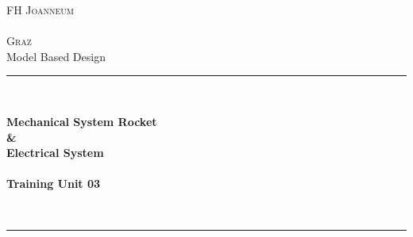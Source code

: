 \thispagestyle{empty}


\begin{titlepage}

	\begin{center}
	
	\textsc{
		\LARGE FH Joanneum\\~\\Graz}\\[1.5cm]
	\vfill{}
	\large Model Based Design
	\\[0.5cm]
	\newcommand{\HRule}{\rule{\linewidth}{0.5mm}}
	\HRule
	\\[0.4cm]
	{
	
		\Huge \bfseries Mechanical System Rocket\\ \&\\ Electrical System\\
						
	        ~\\
	        \large  Training Unit 03  }
	\\[0.4cm]
	\HRule
	\\[0.5cm]
	
	
	\vfill{}
	

\end{center}
\end{titlepage}
